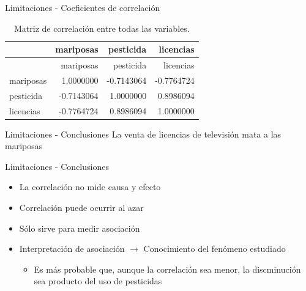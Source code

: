 \documentclass[
  11pt,
  ignorenonframetext,
]{beamer}
\providecommand{\tightlist}{%
  \setlength{\itemsep}{0pt}\setlength{\parskip}{0pt}}
\begin{document}
\begin{frame}{Limitaciones - Coeficientes de correlación}
\protect\hypertarget{limitaciones---coeficientes-de-correlaciuxf3n}{}
\begin{longtable}[]{@{}lrrr@{}}
\caption{Matriz de correlación entre todas las
variables.}\tabularnewline
\toprule()
& mariposas & pesticida & licencias \\
\midrule()
\endfirsthead
\toprule()
& mariposas & pesticida & licencias \\
\midrule()
\endhead
mariposas & 1.0000000 & -0.7143064 & -0.7764724 \\
pesticida & -0.7143064 & 1.0000000 & 0.8986094 \\
licencias & -0.7764724 & 0.8986094 & 1.0000000 \\
\bottomrule()
\end{longtable}
\end{frame}

\begin{frame}{Limitaciones - Conclusiones}
\protect\hypertarget{limitaciones---conclusiones}{}
La venta de licencias de televisión mata a las mariposas
\end{frame}

\begin{frame}{Limitaciones - Conclusiones}
\protect\hypertarget{limitaciones---conclusiones-1}{}
\begin{itemize}
\item
  La correlación no mide causa y efecto
\item
  Correlación puede ocurrir al azar
\item
  Sólo sirve para medir asociación
\item
  Interpretación de asociación \(\rightarrow\) Conocimiento del fenómeno
  estudiado

  \begin{itemize}
  \tightlist
  \item
    Es más probable que, aunque la correlación sea menor, la
    discminución sea producto del uso de pesticidas
  \end{itemize}
\end{itemize}
\end{frame}
\end{document}
